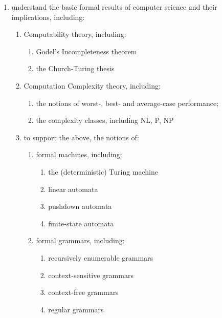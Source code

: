 \documentclass[draft]{article}
\begin{document}
\begin{enumerate}
\begin{enumerate}
  \end{enumerate}

 \item understand the basic formal results of computer science and their implications, including:
    \begin{enumerate} 
      \item Computability theory, including:
        \begin{enumerate}
          \item Godel's Incompleteness theorem
          \item the Church-Turing thesis
        \end{enumerate}

      \item Computation Complexity theory, including:
        \begin{enumerate}
          \item the notions of worst-, best- and average-case performance;
          \item the complexity classes, including NL, P, NP
        \end{enumerate}

     \item to support the above, the notions of:
       \begin{enumerate}
         \item formal machines, including:
           \begin{enumerate}
             \item the (deterministic) Turing machine
             \item linear automata
             \item pushdown automata
             \item finite-state automata
            \end{enumerate}
      
        \item formal grammars, including:
          \begin{enumerate}
            \item recursively enumerable grammars
            \item context-sensitive grammars
            \item context-free grammars
            \item regular grammars
           \end{enumerate}
     \end{enumerate}
      
  \end{enumerate}


\end{enumerate}
\end{document}
